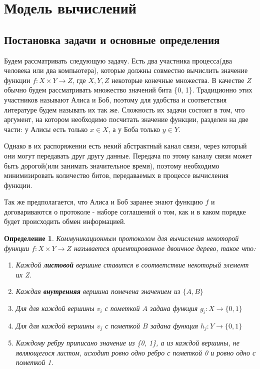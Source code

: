 \documentclass[12pt]{article}
\begin{document}
\tableofcontents
\newpage

\section{Модель вычислений}
\subsection{Постановка задачи и основные определения}


\newtheorem{Def}{Определение}
\newtheorem{Statement}{Утверждение}

Будем рассматривать следующую задачу.
Есть два участника процесса(два человека или два компьютера), которые должны совместно вычислить значение функции
$ f \colon X \times Y \rightarrow Z $, где $X, Y, Z$ некоторые конечные множества.
В качестве $Z$ обычно будем рассматривать множество значений бита \{0, 1\}.
Традиционно этих участников называют Алиса и Боб,
поэтому для удобства и соответствия литературе будем называть их так же.
Сложность их задачи состоит в том, что аргумент, на котором необходимо посчитать значение функции, разделен на две части:
у Алисы есть только $x \in X$, а у Боба только $y \in Y$.

Однако в их распоряжении есть некий абстрактный канал связи, через который они могут передавать друг другу данные. Передача по этому каналу связи может быть дорогой(или занимать значительное время), поэтому необходимо минимизировать количество битов, передаваемых в процессе вычисления функции.

Так же предполагается, что Алиса и Боб заранее знают функцию $f$ и договариваются о протоколе -
наборе соглашений о том, как и в каком порядке будет происходить обмен информацией.

\begin{Def}
Коммуникационным протоколом для вычисления некоторой функции
$ f \colon X \times Y \rightarrow Z $
называется ориентированное двоичное дерево, такое что:
\begin{enumerate}
    \item
    Каждой \textbf{листовой} вершине ставится в соответствие некоторый элемент их Z.
    \item
    Каждая \textbf{внутренняя} вершина помечена значением из $ \{ A, B \} $
    \item
    Для для каждой вершины $v_i$ с пометкой $A$ задана функция \linebreak
    $ g_i \colon X \rightarrow \{0, 1\} $
    \item
    Для для каждой вершины $v_j$ с пометкой $B$ задана функция \linebreak
    $ h_j \colon Y \rightarrow \{0, 1\} $
    \item
    Каждому ребру приписано значение из \{0, 1\}, а из каждой вершины, не являющегося листом, исходит ровно одно ребро с пометкой 0 и ровно одно с пометкой 1.
\end{enumerate}
\end{Def}
\end{document}
